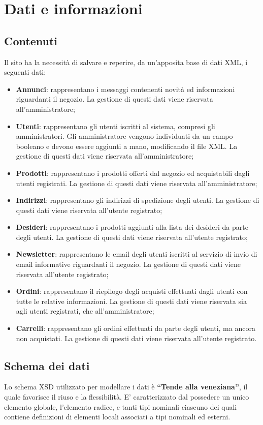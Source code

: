 \section{Dati e informazioni} %
	\subsection{Contenuti}
	Il sito ha la necessità di salvare e reperire, da un'apposita base di dati XML, i seguenti dati:
	\begin{itemize}
		\item \textbf{Annunci}: rappresentano i messaggi contenenti novità ed informazioni riguardanti il negozio. La gestione di questi dati viene riservata all'amministratore;
		\item \textbf{Utenti}: rappresentano gli utenti iscritti al sistema, compresi gli amministratori. Gli amministratore vengono individuati da un campo booleano e devono essere aggiunti a mano, modificando il file XML. La gestione di questi dati viene riservata all'amministratore;
		\item \textbf{Prodotti}: rappresentano i prodotti offerti dal negozio ed acquistabili dagli utenti registrati. La gestione di questi dati viene riservata all'amministratore;
		\item \textbf{Indirizzi}: rappresentano gli indirizzi di spedizione degli utenti. La gestione di questi dati viene riservata all'utente registrato;
		\item \textbf{Desideri}: rappresentano i prodotti aggiunti alla lista dei desideri da parte degli utenti. La gestione di questi dati viene riservata all'utente registrato;
		\item \textbf{Newsletter}: rappresentano le email degli utenti iscritti al servizio di invio di email informative riguardanti il negozio. La gestione di questi dati viene riservata all'utente registrato;
		\item \textbf{Ordini}: rappresentano il riepilogo degli acquisti effettuati dagli utenti con tutte le relative informazioni. La gestione di questi dati viene riservata sia agli utenti registrati, che all'amministratore;
		\item \textbf{Carrelli}: rappresentano gli ordini effettuati da parte degli utenti, ma ancora non acquistati. La gestione di questi dati viene riservata all'utente registrato.
	\end{itemize}
	
	\subsection{Schema dei dati}
	Lo schema XSD utilizzato per modellare i dati è \textbf{``Tende alla veneziana''}, il quale favorisce il riuso e la flessibilità. E' caratterizzato dal possedere un unico elemento globale, l'elemento radice, e tanti tipi nominali ciascuno dei quali contiene definizioni di elementi locali associati a tipi nominali ed esterni.
	
